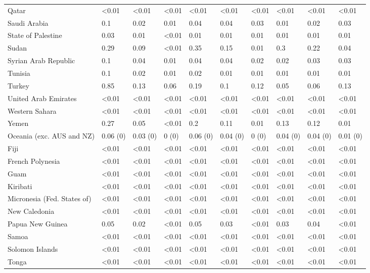 \begin{longtable}[t]{llllllllll}
Qatar & <0.01 & <0.01 & <0.01 & <0.01 & <0.01 & <0.01 & <0.01 & <0.01 & <0.01\\
Saudi Arabia & 0.1 & 0.02 & 0.01 & 0.04 & 0.04 & 0.03 & 0.01 & 0.02 & 0.03\\
State of Palestine & 0.03 & 0.01 & <0.01 & 0.01 & 0.01 & 0.01 & 0.01 & 0.01 & 0.01\\
Sudan & 0.29 & 0.09 & <0.01 & 0.35 & 0.15 & 0.01 & 0.3 & 0.22 & 0.04\\
\addlinespace
Syrian Arab Republic & 0.1 & 0.04 & 0.01 & 0.04 & 0.04 & 0.02 & 0.02 & 0.03 & 0.03\\
Tunisia & 0.1 & 0.02 & 0.01 & 0.02 & 0.01 & 0.01 & 0.01 & 0.01 & 0.01\\
Turkey & 0.85 & 0.13 & 0.06 & 0.19 & 0.1 & 0.12 & 0.05 & 0.06 & 0.13\\
United Arab Emirates & <0.01 & <0.01 & <0.01 & <0.01 & <0.01 & <0.01 & <0.01 & <0.01 & <0.01\\
Western Sahara & <0.01 & <0.01 & <0.01 & <0.01 & <0.01 & <0.01 & <0.01 & <0.01 & <0.01\\
\addlinespace
Yemen & 0.27 & 0.05 & <0.01 & 0.2 & 0.11 & 0.01 & 0.13 & 0.12 & 0.01\\
Oceania (exc. AUS and NZ) & 0.06 (0) & 0.03 (0) & 0 (0) & 0.06 (0) & 0.04 (0) & 0 (0) & 0.04 (0) & 0.04 (0) & 0.01 (0)\\
Fiji & <0.01 & <0.01 & <0.01 & <0.01 & <0.01 & <0.01 & <0.01 & <0.01 & <0.01\\
French Polynesia & <0.01 & <0.01 & <0.01 & <0.01 & <0.01 & <0.01 & <0.01 & <0.01 & <0.01\\
Guam & <0.01 & <0.01 & <0.01 & <0.01 & <0.01 & <0.01 & <0.01 & <0.01 & <0.01\\
\addlinespace
Kiribati & <0.01 & <0.01 & <0.01 & <0.01 & <0.01 & <0.01 & <0.01 & <0.01 & <0.01\\
Micronesia (Fed. States of) & <0.01 & <0.01 & <0.01 & <0.01 & <0.01 & <0.01 & <0.01 & <0.01 & <0.01\\
New Caledonia & <0.01 & <0.01 & <0.01 & <0.01 & <0.01 & <0.01 & <0.01 & <0.01 & <0.01\\
Papua New Guinea & 0.05 & 0.02 & <0.01 & 0.05 & 0.03 & <0.01 & 0.03 & 0.04 & <0.01\\
Samoa & <0.01 & <0.01 & <0.01 & <0.01 & <0.01 & <0.01 & <0.01 & <0.01 & <0.01\\
\addlinespace
Solomon Islands & <0.01 & <0.01 & <0.01 & <0.01 & <0.01 & <0.01 & <0.01 & <0.01 & <0.01\\
Tonga & <0.01 & <0.01 & <0.01 & <0.01 & <0.01 & <0.01 & <0.01 & <0.01 & <0.01\\

\end{longtable}
